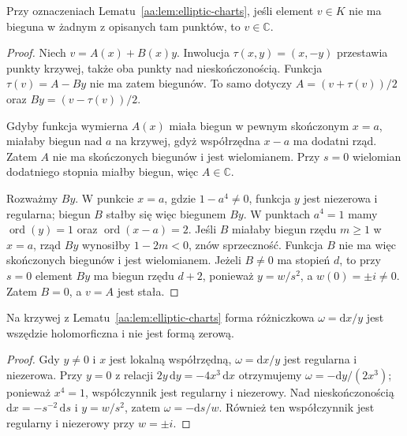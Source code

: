 \begin{lemat}
\label{aa:lem:elliptic-no-poles}
Przy oznaczeniach
Lematu~\ref{aa:lem:elliptic-charts},
jeśli element $v\in K$
nie ma bieguna w żadnym
z opisanych tam punktów,
to $v\in\mathbb C$.
\end{lemat}
\begin{proof}
Niech $v=A(x)+B(x)y$.
Inwolucja $\tau(x,y)=(x,-y)$
przestawia punkty krzywej, także
oba punkty nad nieskończonością.
Funkcja $\tau(v)=A-By$ nie ma
zatem biegunów. To samo dotyczy
$A=(v+\tau(v))/2$ oraz
$By=(v-\tau(v))/2$.

Gdyby funkcja wymierna $A(x)$
miała biegun w pewnym skończonym
$x=a$, miałaby biegun nad $a$
na krzywej, gdyż współrzędna
$x-a$ ma dodatni rząd.
Zatem $A$ nie ma skończonych
biegunów i jest wielomianem.
Przy $s=0$ wielomian
dodatniego stopnia miałby
biegun, więc $A\in\mathbb C$.

Rozważmy $By$. W punkcie
$x=a$, gdzie $1-a^4\ne0$,
funkcja $y$ jest niezerowa
i regularna; biegun $B$
stałby się więc biegunem $By$.
W punktach $a^4=1$ mamy
$\operatorname{ord}(y)=1$
oraz $\operatorname{ord}(x-a)=2$.
Jeśli $B$ miałaby biegun
rzędu $m\ge1$ w $x=a$,
rząd $By$ wynosiłby
$1-2m<0$, znów sprzeczność.
Funkcja $B$ nie ma więc
skończonych biegunów
i jest wielomianem.
Jeżeli $B\ne0$ ma stopień $d$,
to przy $s=0$ element
$By$ ma biegun rzędu $d+2$,
ponieważ $y=w/s^2$, a
$w(0)=\pm i\ne0$.
Zatem $B=0$, a $v=A$
jest stała.
\end{proof}

\begin{lemat}
\label{aa:lem:elliptic-regular-form}
Na krzywej z
Lematu~\ref{aa:lem:elliptic-charts}
forma różniczkowa
$\omega=\mathrm dx/y$ jest
wszędzie holomorficzna
i nie jest formą zerową.
\end{lemat}
\begin{proof}
Gdy $y\ne0$ i $x$ jest
lokalną współrzędną,
$\omega=\mathrm dx/y$
jest regularna i niezerowa.
Przy $y=0$ z relacji
$2y\,\mathrm dy=-4x^3\,\mathrm dx$
otrzymujemy
$\omega=-\mathrm dy/(2x^3)$;
ponieważ $x^4=1$,
współczynnik jest regularny
i niezerowy.
Nad nieskończonością
$\mathrm dx=-s^{-2}\,\mathrm ds$
i $y=w/s^2$, zatem
$\omega=-\mathrm ds/w$.
Również ten współczynnik
jest regularny i niezerowy
przy $w=\pm i$.
\end{proof}

